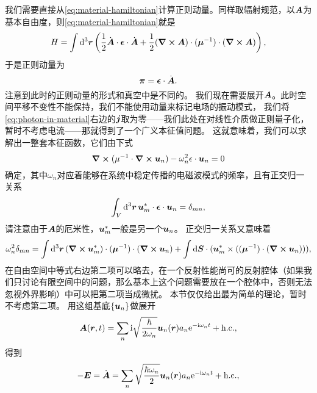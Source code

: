 我们需要直接从\eqref{eq:material-hamiltonian}计算正则动量。同样取辐射规范，以$\vb*{A}$为基本自由度，则\eqref{eq:material-hamiltonian}就是
\begin{equation}
    H = \int \dd[3]{\vb*{r}} \left( \frac{1}{2} \dot{\vb*{A}} \cdot \vb*{\epsilon} \cdot \dot{\vb*{A}} + \frac{1}{2} (\curl{\vb*{A}}) \cdot (\vb*{\mu}^{-1}) \cdot (\curl{\vb*{A}}) \right),
\end{equation}
于是正则动量为
\begin{equation}
    \vb*{\pi} = \vb*{\epsilon} \cdot \dot{\vb*{\vb*{A}}}.
\end{equation}
注意到此时的正则动量的形式和真空中是不同的。
我们现在需要展开$\vb*{A}$。此时空间平移不变性不能保持，我们不能使用动量来标记电场的振动模式，
我们将\eqref{eq:photon-in-material}右边的$\vb*{j}$取为零——我们此处在对线性介质做正则量子化，暂时不考虑电流——那就得到了一个广义本征值问题。
这就意味着，我们可以求解出一整套本征函数，它们由下式
\begin{equation}
    \curl{(\mu^{-1} \cdot \curl{\vb*{u}_n})} - \omega_n^2 \epsilon \cdot \vb*{u}_n = 0
\end{equation}
确定，其中$\omega_n$对应着能够在系统中稳定传播的电磁波模式的频率，且有正交归一关系
\begin{equation}
    \int_V \dd[3]{\vb*{r}} \vb*{u}^*_m \cdot \vb*{\epsilon} \cdot \vb*{u}_n = \delta_{mn}, 
\end{equation}
请注意由于$\vb*{A}$的厄米性，$\vb*{u}_m^*$一般是另一个$\vb*{u}_n$。
正交归一关系又意味着
\begin{equation}
    \omega_n^2 \delta_{mn} = \int \dd[3]{\vb*{r}} (\curl{\vb*{u}_m^*}) \cdot (\vb*{\mu}^{-1}) \cdot (\curl{\vb*{u}_n}) + \int \dd{\vb*{S}} \cdot (\vb*{u}_m^* \times ((\vb*{\mu}^{-1}) \cdot (\curl{\vb*{u}_n}))),
\end{equation}
在自由空间中等式右边第二项可以略去，在一个反射性能尚可的反射腔体（如果我们只讨论有限空间中的问题，那么基本上这个问题需要放在一个腔体中，否则无法忽视外界影响）中可以把第二项当成微扰。
本节仅仅给出最为简单的理论，暂时不考虑第二项。
用这组基底$\{\vb*{u}_n\}$做展开
\begin{equation}
    \vb*{A}(\vb*{r}, t) = \sum_n \mathrm{i} \sqrt{\frac{\hbar}{2\omega_{n}}} \vb*{u}_n(\vb*{r}) a_n \mathrm{e}^{- \mathrm{i} \omega_n t} + \text{h.c.},
\end{equation}
得到
\begin{equation}
    - \vb*{E} = \dot{\vb*{A}} = \sum_n \sqrt{\frac{\hbar \omega_n}{2}} \vb*{u}_n(\vb*{r}) a_n \mathrm{e}^{-\mathrm{i} \omega_n t} + \text{h.c.},
\end{equation}
